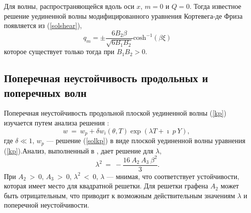 Для волны, распространяющейся вдоль оси $ x $, $ m = 0 $ и $ Q = 0 $. Тогда известное решение уединенной волны модифицированного уравнения Кортевега-де Фриза появляется из (\ref {solshear}),
\begin{equation}
	q_m=\pm \frac{6B_2 \beta}{\sqrt{6 B_1 B_2}}{\text{cosh}}^{-1}(\beta \xi) \label{qp}
\end{equation}
которое существует только тогда при $ B_1 B_2 > 0 $.

\subsection{Поперечная неустойчивость продольных и поперечных волн}

Поперечная неустойчивость продольной плоской уединенной волны (\ref {kp}) изучается путем анализа решения \cite{Ablowitz}:
\begin{equation}
	w~=~w_p+\delta w_i (\theta,T)\exp (\lambda T +\imath~p~ Y),~\label{stlong}
\end{equation}
где $ \delta \ll 1 $, $ w_p $ --- решение (\ref {solkp}) в виде плоской уединенной волны уравнения (\ref{kp}).Анализ, выполненный в \cite{porkros}, дает решение для $\lambda$,
\begin{equation}
	\lambda^2~=~-\frac{16~A_2~ A_3~\beta^2}{3}.
\end{equation}
При $ A_2 ~> ~ 0 $, $ A_3 ~> ~ 0 $, $ \lambda ^ 2 ~ <~ 0 $, $ \lambda $ --- мнимая, что соответствует устойчивости, которая имеет место для квадратной решетки. Для решетки графена $ A_2 $ может быть отрицательным, что приводит к возможным действительным значениям $ \lambda $ и поперечной неустойчивости.

